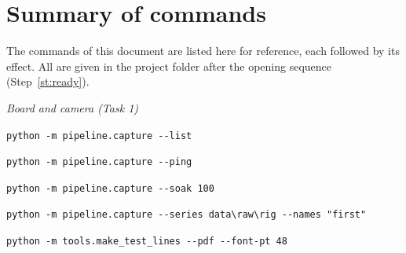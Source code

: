 \section{Summary of commands}
\label{sec:tsummary}

The commands of this document are listed here for reference, each followed by its effect. All
are given in the project folder after the opening sequence (Step~\ref{st:ready}).

\medskip\noindent\textit{Board and camera (Task 1)}\par\nopagebreak\smallskip
\noindent\lstinline[style=sumlist]|python -m pipeline.capture --list|\\
\hspace*{1.2em}{\small List the serial ports}\par\smallskip
\noindent\lstinline[style=sumlist]|python -m pipeline.capture --ping|\\
\hspace*{1.2em}{\small Ask the board whether it answers}\par\smallskip
\noindent\lstinline[style=sumlist]|python -m pipeline.capture --soak 100|\\
\hspace*{1.2em}{\small Reliability test with 100 pictures}\par\smallskip
\noindent\lstinline[style=sumlist]|python -m pipeline.capture --series data\raw\rig --names "first"|\\
\hspace*{1.2em}{\small Viewfinder; saves the photographs named}\par\smallskip
\noindent\lstinline[style=sumlist]|python -m tools.make_test_lines --pdf --font-pt 48|\\
\hspace*{1.2em}{\small Larger print of the test lines (contingency)}\par\smallskip

